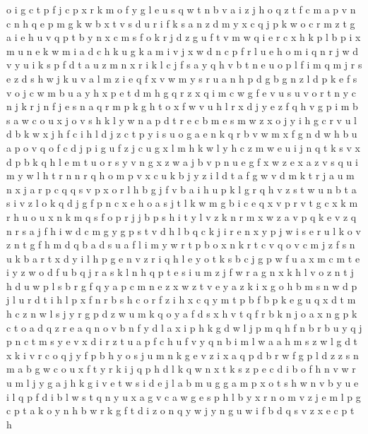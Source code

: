 \documentclass{article}
\begin{document}
o i g c t p f j
c p x r k m o f y g l e u s q w t n b v a i z j h
o q z t f c m a p v n
c n h q e p m g k w b x t v s d u
r i f k s a n z d m y x c
q j p k w o c r m z t g a i e
h u v q p t b y n x c m s f o k r
j d z g u f t v m w q i e r c x h k p l b
p
i x m u n e k w
m i a d c h k u
g k a m i v j x w d n c p f r l u e h o
m i q n r
j w d v y u i k
s p f d t a
u z m n x r i k l c j f s a y q h v
b t n e u o p l f i m
q m j r s e z d
s h w j k u v a l m z
i e q f x v w m y s r u a n h p d g b
g n z l d p k e f s v o j c w m b u a y h x
p e t d m h g q r
z x q i m c w g f e v u s
u v o r t n y
c n j
k r j n f
j e s n a q r m p k g h t o x f w
v u h
l r x d j y e z f q h v g p i m b s a w c o
u x j o v s h k l y w n a p d t r e c b m
e s m w z x o j y i h g c r v u l d b k
w x j h f c i
h l d j z c t p y i s u o g a e n k q r b v w m x f
g n d w h b u a p o v q
o f
c d j p i g u f z
j c u g x l m h k w
l y h c z m w e u i j n q t k s v x d
p b k q h l e m t u o r s y v n g x z w a j
b v p n u
e g f x w z
e x a z v s q u i m y w l h t r n
n r q h o m p v x c u k b j y z i l d t a f g w
v d m k t r j a u
m n x j a r p c q
q s v p x o r l h b g
j f v b a i
h u p k l g r q
h v z s t w u n
b t a s i v z l o k q d j g f p n c x e h
o a s j t l k w m g b i c e q x v p r
v t g c x k m r h u o
u x n k m q s f o p r j
j b p s h i t y l v z k n
r m x w z a v p q
k e v z q n r s a j f h i w d c m g y
g p s t v d h l b q c k j i r e n x y
p j w i s e r u l k o v z n t g f h m d q b a
d s u a f l i m y w r t p b o x
n k r
t c v
q o v c m j z f s n u k b a r t x d y i l h p g e
n v z r i q h l e y o t k s b c j g p w f u a x m
c m t e i y z w o d f u b q j r a s k l n h
q p t e s i u m z j f w r a g n x k h l
v o z n t j h d u w p l s b r g f q
y a p c m n e z
x w z
t v e y a z k i x g o h b m s n w d p j l u r
d t i h l p x f n r b s
h c o r f z
i h x c q y m t p b
f b p k e g u q x d t m h c z n w l s j y
r g p d z w u m k q o y a f
d s x h v t q f r b k n j o a
x n g p k c t o a d q z
r e a q n o v
b n f y d l a x i p h
k g d w l j p m q h f n b
r b u y q j p n c t m
s y e v x d i r z t u a p f c h
u f v y q n b i m
l w a
a h m s z w l g d t x k i v r c o q j y f p b
h y o s j u m n k g e v z i x a q p d b r w f
g p l d z
z s n m a b g w c o u x f t y r k i j q p h d l
k q w n
x t k s z p e c d i b o f h n v w r u m l j y g a
j h k g i v e
t w s i d e j l a b m u g
g
a m p x o t s h w n v b y u e i l q
p f d i b l w s t q n y u x a g v
c a w g e s p h l b y x r n o m v z j
e m l p g
c p t a k o y n h b
w r k g f t d i z o n q y
w
j y n g u w i f b d q s v z x e c p t h
\end{document}
